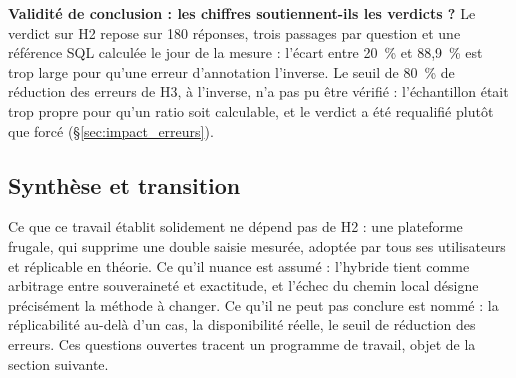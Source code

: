 \textbf{Validité de conclusion : les chiffres soutiennent-ils les verdicts ?} Le verdict sur H2 repose sur 180 réponses, trois passages par question et une référence SQL calculée le jour de la mesure : l'écart entre 20~\% et 88,9~\% est trop large pour qu'une erreur d'annotation l'inverse. Le seuil de 80~\% de réduction des erreurs de H3, à l'inverse, n'a pas pu être vérifié : l'échantillon était trop propre pour qu'un ratio soit calculable, et le verdict a été requalifié plutôt que forcé (§\ref{sec:impact_erreurs}).

\subsection{Synthèse et transition}
\label{sec:disc_synthese}

Ce que ce travail établit solidement ne dépend pas de H2 : une plateforme frugale, qui supprime une double saisie mesurée, adoptée par tous ses utilisateurs et réplicable en théorie. Ce qu'il nuance est assumé : l'hybride tient comme arbitrage entre souveraineté et exactitude, et l'échec du chemin local désigne précisément la méthode à changer. Ce qu'il ne peut pas conclure est nommé : la réplicabilité au-delà d'un cas, la disponibilité réelle, le seuil de réduction des erreurs. Ces questions ouvertes tracent un programme de travail, objet de la section suivante.
